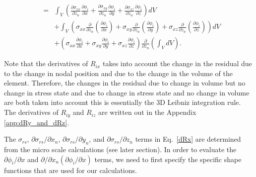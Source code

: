 \begin{eqnarray}
&=& \int_V \left(\frac{\partial \sigma_{xx}}{\partial z_n}\frac{\partial \phi_i}{\partial x} +\frac{\partial \sigma_{xy}}{\partial z_n} \frac{\partial \phi_i}{\partial y} + \frac{\partial \sigma_{xz}}{\partial z_n}\frac{\partial \phi_i}{\partial z}  \right) dV \nonumber\\
&&+ \int_V \left(\sigma_{xx} \frac{\partial}{\partial z_n} \left(\frac{\partial \phi_i}{\partial x}\right)+ \sigma_{xy} \frac{\partial}{\partial z_n} \left(\frac{\partial \phi_i}{\partial y}\right) + \sigma_{xz} \frac{\partial}{\partial z_n} \left(\frac{\partial \phi_i}{\partial z}\right) \right) dV \nonumber\\
&& + \left(  \sigma_{xx} \frac{\partial \phi_i}{\partial x} + \sigma_{xy} \frac{\partial \phi_i}{\partial y} + \sigma_{xz} \frac{\partial \phi_i}{\partial z} \right) \frac{\partial}{\partial z_n} \left(\int_V dV \right).
\label{dRx}
\end{eqnarray}
%

Note that the derivatives of $R_{ix}$ takes into account the change in the residual due to the change in nodal position and due to the change in the volume of the element. Therefore, the changes in the residual due to change in volume but no change in stress state and due to change in stress state and no change in volume are both taken into account this is essentially the 3D Leibniz integration rule. The derivatives of $R_{iy}$ and $R_{iz}$ are written out in the Appendix \ref{app:dRy_and_dRz}.

The $\sigma_{rs}$, $\partial \sigma_{rs}/\partial x_n$, $\partial \sigma_{rs}/\partial y_n$, and $\partial \sigma_{rs}/\partial z_n$ terms in Eq.\ \eqref{dRx} are determined from the micro scale calculations (see later section). In order to evaluate the $\partial \phi_i/\partial x$ and $\partial /\partial x_n (\partial \phi_i/\partial x)$ terms, we need to first specify the specific shape functions that are used for our calculations.

